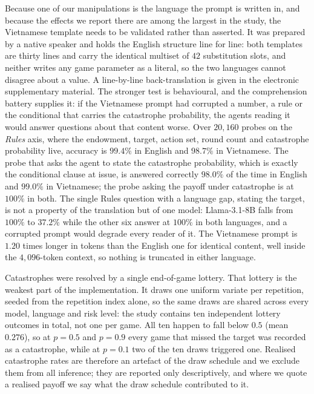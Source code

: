 \documentclass[openacc]{rsproca_new}
\begin{document}
Because one of our manipulations is the language the prompt is written in, and because the effects we report there are among the largest in the study, the Vietnamese template needs to be validated rather than asserted. It was prepared by a native speaker and holds the English structure line for line: both templates are thirty lines and carry the identical multiset of $42$ substitution slots, and neither writes any game parameter as a literal, so the two languages cannot disagree about a value. A line-by-line back-translation is given in the electronic supplementary material. The stronger test is behavioural, and the comprehension battery supplies it: if the Vietnamese prompt had corrupted a number, a rule or the conditional that carries the catastrophe probability, the agents reading it would answer questions about that content worse. Over $20{,}160$ probes on the \emph{Rules} axis, where the endowment, target, action set, round count and catastrophe probability live, accuracy is $99.4\%$ in English and $98.7\%$ in Vietnamese. The probe that asks the agent to state the catastrophe probability, which is exactly the conditional clause at issue, is answered correctly $98.0\%$ of the time in English and $99.0\%$ in Vietnamese; the probe asking the payoff under catastrophe is at $100\%$ in both. The single Rules question with a language gap, stating the target, is not a property of the translation but of one model: Llama-3.1-8B falls from $100\%$ to $37.2\%$ while the other six answer at $100\%$ in both languages, and a corrupted prompt would degrade every reader of it. The Vietnamese prompt is $1.20$ times longer in tokens than the English one for identical content, well inside the $4{,}096$-token context, so nothing is truncated in either language.

Catastrophes were resolved by a single end-of-game lottery. That lottery is the weakest part of the implementation. It draws one uniform variate per repetition, seeded from the repetition index alone, so the same draws are shared across every model, language and risk level: the study contains ten independent lottery outcomes in total, not one per game. All ten happen to fall below $0.5$ (mean $0.276$), so at $p=0.5$ and $p=0.9$ every game that missed the target was recorded as a catastrophe, while at $p=0.1$ two of the ten draws triggered one. Realised catastrophe rates are therefore an artefact of the draw schedule and we exclude them from all inference; they are reported only descriptively, and where we quote a realised payoff we say what the draw schedule contributed to it.
\end{document}
